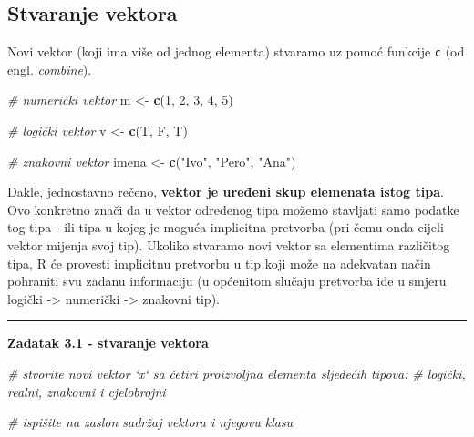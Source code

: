 \documentclass[]{book}
\newenvironment{Shaded}{\begin{snugshade}}{\end{snugshade}}
\newcommand{\KeywordTok}[1]{\textcolor[rgb]{0.13,0.29,0.53}{\textbf{#1}}}
\newcommand{\DecValTok}[1]{\textcolor[rgb]{0.00,0.00,0.81}{#1}}
\newcommand{\StringTok}[1]{\textcolor[rgb]{0.31,0.60,0.02}{#1}}
\newcommand{\CommentTok}[1]{\textcolor[rgb]{0.56,0.35,0.01}{\textit{#1}}}
\newcommand{\NormalTok}[1]{#1}
\theoremstyle{definition}
\theoremstyle{definition}
\theoremstyle{definition}
\theoremstyle{remark}
\begin{document}
\subsection{Stvaranje vektora}\label{stvaranje-vektora}

Novi vektor (koji ima više od jednog elementa) stvaramo uz pomoć
funkcije \texttt{c} (od engl. \emph{combine}).

\begin{Shaded}
\begin{Highlighting}[]
\CommentTok{# numerički vektor}
\NormalTok{m <-}\StringTok{ }\KeywordTok{c}\NormalTok{(}\DecValTok{1}\NormalTok{, }\DecValTok{2}\NormalTok{, }\DecValTok{3}\NormalTok{, }\DecValTok{4}\NormalTok{, }\DecValTok{5}\NormalTok{)  }

\CommentTok{# logički vektor}
\NormalTok{v <-}\StringTok{ }\KeywordTok{c}\NormalTok{(T, F, T)}

\CommentTok{# znakovni vektor}
\NormalTok{imena <-}\StringTok{ }\KeywordTok{c}\NormalTok{(}\StringTok{"Ivo"}\NormalTok{, }\StringTok{"Pero"}\NormalTok{, }\StringTok{"Ana"}\NormalTok{)}
\end{Highlighting}
\end{Shaded}

Dakle, jednostavno rečeno, \textbf{vektor je uređeni skup elemenata
istog tipa}. Ovo konkretno znači da u vektor određenog tipa možemo
stavljati samo podatke tog tipa - ili tipa u kojeg je moguća implicitna
pretvorba (pri čemu onda cijeli vektor mijenja svoj tip). Ukoliko
stvaramo novi vektor sa elementima različitog tipa, R će provesti
implicitnu pretvorbu u tip koji može na adekvatan način pohraniti svu
zadanu informaciju (u općenitom slučaju pretvorba ide u smjeru logički
-\textgreater{} numerički -\textgreater{} znakovni tip).

\begin{center}\rule{0.5\linewidth}{\linethickness}\end{center}

\textbf{Zadatak 3.1 - stvaranje vektora}

\begin{Shaded}
\begin{Highlighting}[]
\CommentTok{# stvorite novi vektor `x` sa četiri proizvoljna elementa sljedećih tipova: }
\CommentTok{#  logički, realni, znakovni i cjelobrojni}

\CommentTok{# ispišite na zaslon sadržaj vektora i njegovu klasu}
\end{Highlighting}
\end{Shaded}
\end{document}
